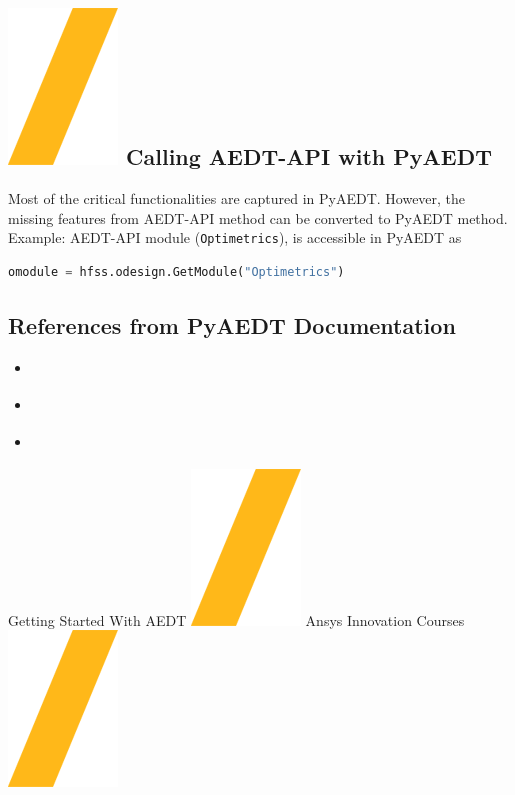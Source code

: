 \documentclass[9pt,landscape]{article}
\begin{document}
\begin{multicols}{3}
\section{\includegraphics[height=\fontcharht\font`\S]{slash.png} Calling AEDT-API with PyAEDT}
Most of the critical functionalities are captured in PyAEDT. However, the missing features from AEDT-API method can be converted to PyAEDT method.
\newline
\\
Example: AEDT-API module (\texttt{Optimetrics}), is accessible in PyAEDT as
\begin{lstlisting}[language=Python]
omodule = hfss.odesign.GetModule("Optimetrics")
\end{lstlisting}

\subsection{References from PyAEDT Documentation}
\begin{itemize}
\item \href{https://aedt.docs.pyansys.com/version/stable/Getting_started/index.html}{\color{blue}{Getting Started}}
\item \href{https://aedt.docs.pyansys.com/version/stable/User_guide/index.html}{\color{blue}{User Guide}}
\item \href{https://aedt.docs.pyansys.com/version/stable/API/index.html}{\color{blue}{API Reference}}
\end{itemize}
\end{multicols}
\vspace{-0.15cm}
\noindent\makebox[\linewidth]{\rule{\paperwidth}{4pt}}
\begin{center}
Getting Started With AEDT \includegraphics[height=\fontcharht\font`\S]{slash.png} Ansys Innovation Courses \includegraphics[height=\fontcharht\font`\S]{slash.png} %
\end{center}
\end{document}
